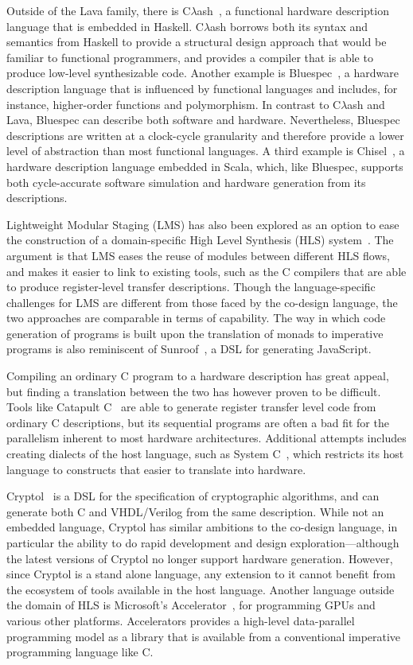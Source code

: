 \documentclass[../paper.tex]{subfiles}
\begin{document}
Outside of the Lava family, there is C$\lambda$ash~\cite{baaij2010}, a functional hardware description language that is embedded in Haskell. C$\lambda$ash borrows both its syntax and semantics from Haskell to provide a structural design approach that would be familiar to functional programmers, and provides a compiler that is able to produce low-level synthesizable code. Another example is Bluespec~\cite{nikhil2004}, a hardware description language that is influenced by functional languages and includes, for instance, higher-order functions and polymorphism. In contrast to C$\lambda$ash and Lava, Bluespec can describe both software and hardware. Nevertheless, Bluespec descriptions are written at a clock-cycle granularity and therefore provide a lower level of abstraction than most functional languages. A third example is Chisel~\cite{bachrach2012}, a hardware description language embedded in Scala, which, like Bluespec, supports both cycle-accurate software simulation and hardware generation from its descriptions.

Lightweight Modular Staging (LMS) has also been explored as an option to ease the construction of a domain-specific High Level Synthesis (HLS) system~\cite{george2013}. The argument is that LMS eases the reuse of modules between different HLS flows, and makes it easier to link to existing tools, such as the C compilers that are able to produce register-level transfer descriptions. Though the language-specific challenges for LMS are different from those faced by the co-design language, the two approaches are comparable in terms of capability. The way in which code generation of programs is built upon the translation of monads to imperative programs is also reminiscent of Sunroof~\cite{gill2014}, a DSL for generating JavaScript.

Compiling an ordinary C program to a hardware description has great appeal, but finding a translation between the two has however proven to be difficult. Tools like Catapult C~\cite{graphics2008} are able to generate register transfer level code from ordinary C descriptions, but its sequential programs are often a bad fit for the parallelism inherent to most hardware architectures. Additional attempts includes creating dialects of the host language, such as System C~\cite{ghenassia2005}, which restricts its host language to constructs that easier to translate into hardware.

Cryptol~\cite{cryptol} is a DSL for the specification of cryptographic algorithms, and can generate both C and VHDL/Verilog from the same description. While not an embedded language, Cryptol has similar ambitions to the co-design language, in particular the ability to do rapid development and design exploration---although the latest versions of Cryptol no longer support hardware generation. However, since Cryptol is a stand alone language, any extension to it cannot benefit from the ecosystem of tools available in the host language. Another language outside the domain of HLS is Microsoft's Accelerator~\cite{accelerator}, for programming GPUs and various other platforms. Accelerators provides a high-level data-parallel programming model as a library that is available from a conventional imperative programming language like C.
\end{document}
